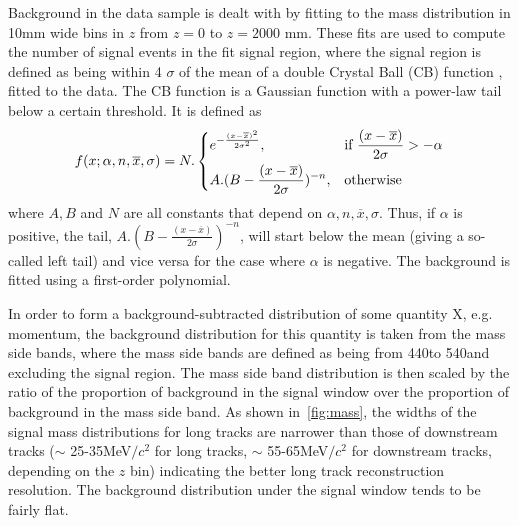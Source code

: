 Background in the data sample is dealt with by fitting to the \KS mass distribution in 10mm wide bins in $z$ from $z = 0$ to $z = 2000$ mm.  These fits are used to compute the number of signal events in the fit signal region, where the signal region is defined as being within 4 $\sigma$ of the mean of a double Crystal Ball (\Gls{CB}) function \cite{Skwarnicki:1986xj}, fitted to the data. The CB function is a Gaussian function with a power-law tail below a certain threshold. It is defined as
\begin{equation}
  f(x; \alpha,n,\overline{x},\sigma) = N.
  \begin{dcases}
    e^{-\frac{(x-\overline{x})^{2}}{2\sigma^{2}}},& \text{if } \frac{(x-\overline{x})}{2\sigma}  >-\alpha\\
    A.(B - \frac{(x-\overline{x})}{2\sigma})^{-n}, & \text{otherwise}
  \end{dcases}
  \label{Eq:CB}
\end{equation}
where $A, B$ and $N$ are all constants that depend on ${\alpha,n,\overline{x},\sigma}$. Thus, if $\alpha$ is positive, the tail, $A.(B - \frac{(x-\overline{x})}{2\sigma})^{-n}$, will start below the mean (giving a so-called left tail) and vice versa for the case where $\alpha$ is negative. The background is fitted using a first-order polynomial. %

In order to form a background-subtracted distribution of some quantity X, e.g. momentum, the background distribution for this quantity is taken from the mass side bands, where the mass side bands are defined as being from 440\mevcc to 540\mevcc and excluding the signal region. The mass side band distribution is then scaled by the ratio of the proportion of background in the signal window over the proportion of background in the mass side band. As shown in~\autoref{fig:mass}, the widths of the signal mass distributions for long tracks are narrower than those of downstream tracks ($\sim$ 25-35\:MeV$/c^{2}$ for long tracks, $\sim$ 55-65\:MeV$/c^{2}$ for downstream tracks, depending on the $z$ bin) indicating the better long track reconstruction resolution. The background distribution under the signal window tends to be fairly flat. %

